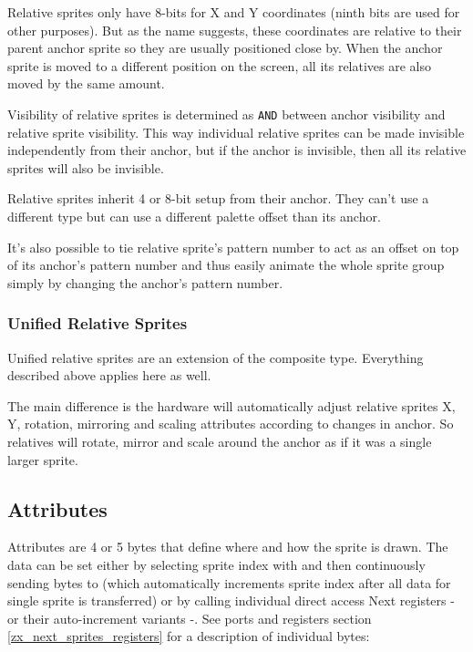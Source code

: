 Relative sprites only have 8-bits for X and Y coordinates (ninth bits are used for other purposes). But as the name suggests, these coordinates are relative to their parent anchor sprite so they are usually positioned close by. When the anchor sprite is moved to a different position on the screen, all its relatives are also moved by the same amount.

Visibility of relative sprites is determined as {\tt AND} between anchor visibility and relative sprite visibility. This way individual relative sprites can be made invisible independently from their anchor, but if the anchor is invisible, then all its relative sprites will also be invisible.

Relative sprites inherit 4 or 8-bit setup from their anchor. They can't use a different type but can use a different palette offset than its anchor.

It's also possible to tie relative sprite's pattern number to act as an offset on top of its anchor's pattern number and thus easily animate the whole sprite group simply by changing the anchor's pattern number.

\subsubsection{Unified Relative Sprites}

Unified relative sprites are an extension of the composite type. Everything described above applies here as well.

The main difference is the hardware will automatically adjust relative sprites X, Y, rotation, mirroring and scaling attributes according to changes in anchor. So relatives will rotate, mirror and scale around the anchor as if it was a single larger sprite.

\subsection{Attributes}

Attributes are 4 or 5 bytes that define where and how the sprite is drawn. The data can be set either by selecting sprite index with  and then continuously sending bytes to  (which automatically increments sprite index after all data for single sprite is transferred) or by calling individual direct access Next registers - or their auto-increment variants -. See ports and registers section \ref{zx_next_sprites_registers} for a description of individual bytes:

